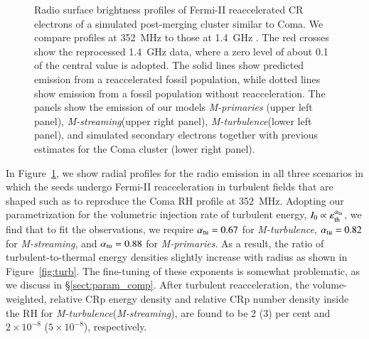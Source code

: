 \documentclass[fleqn,usenatbib,useAMS]{mnras}
\newcommand{\Mstream}{{\it M-streaming}\xspace}
\newcommand{\Mflatturb}{{\it M-turbulence}\xspace}
\newcommand{\Mprimary}{{\it M-primaries}\xspace}
\newcommand{\eps}{\varepsilon}
\begin{document}
\begin{figure}
\begin{minipage}{1\columnwidth}
\begin{center}
   \end{center}
\end{minipage}
\caption{Radio surface brightness profiles of Fermi-II reaccelerated CR
  electrons of a simulated post-merging cluster similar to Coma. We compare
  profiles at 352~MHz \citep[blue lines and crosses,][]{brown11} to those at
  1.4~GHz \citep[green lines and crosses,][]{deiss97}. The red crosses show the
  reprocessed 1.4~GHz data, where a zero level of about 0.1 of the central value
  is adopted. The solid lines show predicted emission from a reaccelerated
  fossil population, while dotted lines show emission from a fossil population
  without reacceleration. The panels show the emission of our models \Mprimary
  (upper left panel), \Mstream (upper right panel), \Mflatturb (lower left
  panel), and simulated secondary electrons together with previous estimates
  \citep{brunetti12} for the Coma cluster (lower right panel).}
  \label{fig:sync_profile}
\end{figure}

In Figure~\ref{fig:sync_profile}, we show radial profiles for the radio
emission in all three scenarios in which the seeds undergo Fermi-II
reacceleration in turbulent fields that are shaped such as to
reproduce the Coma RH profile at 352~MHz.  Adopting our
parametrization for the volumetric injection rate of turbulent energy,
$I_0\propto \eps_\rmn{th}^{\alpha_\rmn{tu}}$, we find that to fit the observations, we require
$\alpha_{\mathrm{tu}}= 0.67$ for \Mflatturb, $\alpha_{\mathrm{tu}}= 0.82$ for
\Mstream, and $\alpha_{\mathrm{tu}}= 0.88$ for \Mprimary. As a result, the
ratio of turbulent-to-thermal energy densities slightly increase with
radius as shown in Figure~\ref{fig:turb}.  The fine-tuning of these exponents is somewhat problematic, as we discuss in \S\ref{sect:param_comp}. After turbulent
reacceleration, the volume-weighted, relative CRp energy density and
relative CRp number density inside the RH for \Mflatturb (\Mstream),
are found to be 2 (3) per cent and $2\times10^{-8}$ ($5\times10^{-8}$),
respectively.
\end{document}
